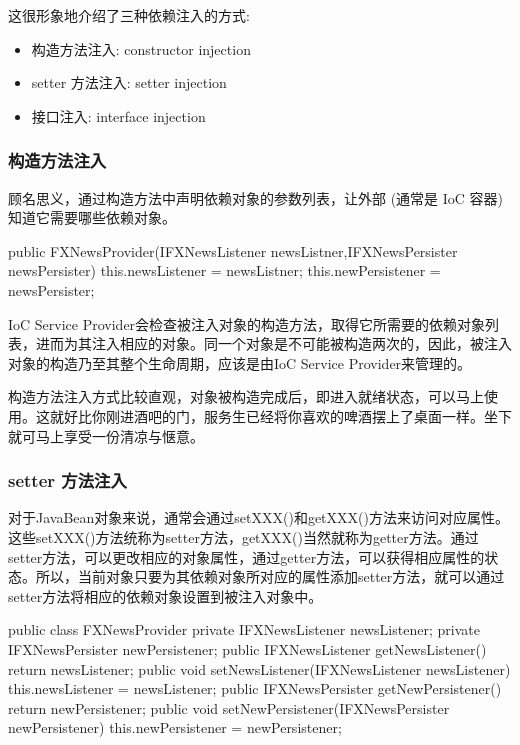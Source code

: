 这很形象地介绍了三种依赖注入的方式:
\begin{itemize}
    \item 构造方法注入: constructor injection
    \item setter 方法注入: setter injection
    \item 接口注入: interface injection
\end{itemize}

\subsubsection{构造方法注入}

顾名思义，通过构造方法中声明依赖对象的参数列表，让外部 (通常是 IoC 容器) 知道它需要哪些依赖对象。

\begin{Java}
public FXNewsProvider(IFXNewsListener newsListner,IFXNewsPersister newsPersister) {   
    this.newsListener   = newsListner; 
    this.newPersistener = newsPersister;
}
\end{Java}

IoC Service Provider会检查被注入对象的构造方法，取得它所需要的依赖对象列表，进而为其注入相应的对象。同一个对象是不可能被构造两次的，因此，被注入对象的构造乃至其整个生命周期，应该是由IoC Service Provider来管理的。

构造方法注入方式比较直观，对象被构造完成后，即进入就绪状态，可以马上使用。这就好比你刚进酒吧的门，服务生已经将你喜欢的啤酒摆上了桌面一样。坐下就可马上享受一份清凉与惬意。

\subsubsection{setter 方法注入}

对于JavaBean对象来说，通常会通过setXXX()和getXXX()方法来访问对应属性。这些setXXX()方法统称为setter方法，getXXX()当然就称为getter方法。通过setter方法，可以更改相应的对象属性，通过getter方法，可以获得相应属性的状态。所以，当前对象只要为其依赖对象所对应的属性添加setter方法，就可以通过setter方法将相应的依赖对象设置到被注入对象中。

\begin{Java}
public class FXNewsProvider {
    private IFXNewsListener  newsListener;
    private IFXNewsPersister newPersistener;
    public IFXNewsListener getNewsListener() {     
        return  newsListener;    
    }    
    public void setNewsListener(IFXNewsListener newsListener) {     
        this.newsListener = newsListener;   
    }    
    public IFXNewsPersister getNewPersistener() {     
        return  newPersistener;    
    }    
    public void setNewPersistener(IFXNewsPersister newPersistener) {     
        this.newPersistener = newPersistener;   
    }
}
\end{Java}

